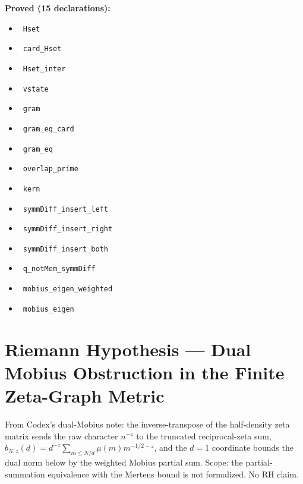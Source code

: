 \documentclass{report}
\theoremstyle{definition}
\begin{document}
\noindent\textbf{Proved (15 declarations):}
\begin{itemize}
  \item {}\leanok\ \texttt{Hset}
  \item {}\leanok\ \texttt{card\_Hset}
  \item {}\leanok\ \texttt{Hset\_inter}
  \item {}\leanok\ \texttt{vstate}
  \item {}\leanok\ \texttt{gram}
  \item {}\leanok\ \texttt{gram\_eq\_card}
  \item {}\leanok\ \texttt{gram\_eq}
  \item {}\leanok\ \texttt{overlap\_prime}
  \item {}\leanok\ \texttt{kern}
  \item {}\leanok\ \texttt{symmDiff\_insert\_left}
  \item {}\leanok\ \texttt{symmDiff\_insert\_right}
  \item {}\leanok\ \texttt{symmDiff\_insert\_both}
  \item {}\leanok\ \texttt{q\_notMem\_symmDiff}
  \item {}\leanok\ \texttt{mobius\_eigen\_weighted}
  \item {}\leanok\ \texttt{mobius\_eigen}
\end{itemize}

\section{Riemann Hypothesis --- Dual Mobius Obstruction in the Finite Zeta-Graph Metric}
From Codex's dual-Mobius note: the inverse-transpose of the half-density zeta matrix sends the raw character $n^{-z}$ to the truncated reciprocal-zeta sum, $b_{N,z}(d)=d^{-z}\sum_{m\le N/d}\mu(m)m^{-1/2-z}$, and the $d=1$ coordinate bounds the dual norm below by the weighted Mobius partial sum. Scope: the partial-summation equivalence with the Mertens bound is not formalized. No RH claim.
\end{document}
